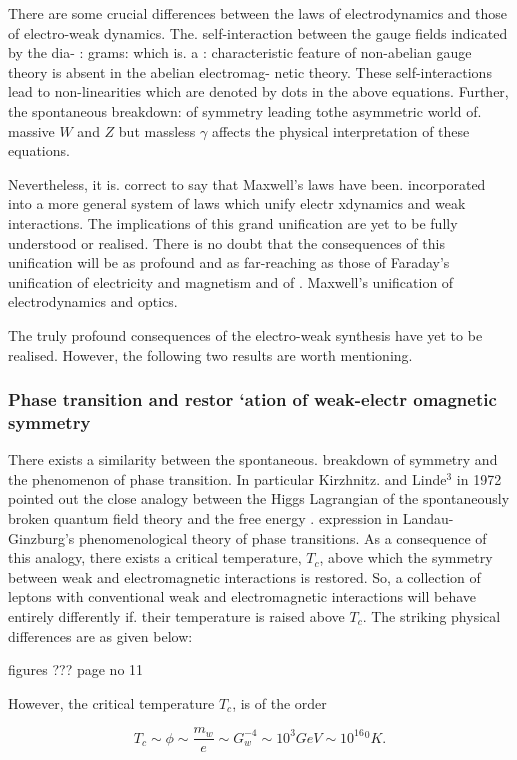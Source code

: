 There are some crucial differences between the laws of electrodynamics
and those of electro-weak dynamics. The. self-interaction between the gauge fields indicated by the dia- :
grams: which is. a : characteristic
feature of non-abelian gauge theory
is absent in the abelian electromag-
netic theory. These self-interactions
lead to non-linearities which are denoted by dots in the above equations. Further, the spontaneous breakdown:
of symmetry leading tothe asymmetric world of. massive $W$ and $Z$ but massless $\gamma$ affects the physical interpretation of these equations. 


Nevertheless, it is. correct to say that Maxwell's laws have been.
incorporated into a more general system of laws which unify electr xdynamics and weak interactions. The implications of this grand unification 
are yet to be fully understood or realised. There is no doubt that the
consequences of this unification will be as profound and as far-reaching
as those of Faraday’s unification of electricity and magnetism and of .
Maxwell's unification of electrodynamics and optics. 

The truly profound consequences of the electro-weak synthesis have
yet to be realised. However, the following two results are worth
mentioning. 

\subsubsection*{Phase transition and restor ‘ation of weak-electr omagnetic symmetry}

There exists a similarity between the spontaneous. breakdown of symmetry
and the phenomenon of phase transition. In particular Kirzhnitz. and
Linde$^{3}$ in 1972 pointed out the close analogy between the Higgs Lagrangian
of the spontaneously broken quantum field theory and the free energy
. expression in Landau-Ginzburg’s phenomenological theory of phase
transitions. As a consequence of this analogy, there exists a critical
temperature, $T_{c}$, above which the symmetry between weak and electromagnetic interactions is restored. So, a collection of leptons with conventional weak and electromagnetic interactions will behave entirely differently
if. their temperature is raised above $T_{c}$. The striking physical differences are as given below: 

figures ??? page no 11


However, the critical temperature $T_{c}$, is of the order 

$$
T_{c} \sim \phi \sim \frac{m_{w}}{e} \sim G_{w}^{-4} \sim 10^{3} GeV \sim 10^{16} {^{0}K}.
$$

